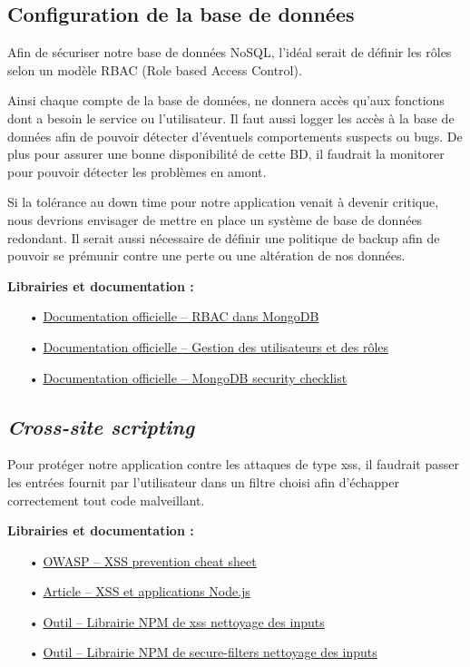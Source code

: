\documentclass[12pt]{article}
\begin{document}
\subsection{Configuration de la base de données}
\label{ssec:cm-configdb}

Afin de sécuriser notre base de données NoSQL, l'idéal serait de définir les rôles selon un modèle RBAC (Role based Access Control). 

Ainsi chaque compte de la base de données, ne donnera accès qu'aux fonctions dont a besoin le service ou l'utilisateur. Il faut aussi logger les accès à la base de données afin de pouvoir détecter d'éventuels comportements suspects ou bugs. De plus pour assurer une bonne disponibilité de cette BD, il faudrait la monitorer pour pouvoir détecter les problèmes en amont. 

Si la tolérance au down time pour notre application venait à devenir critique, nous devrions envisager de mettre en place un système de base de données redondant. Il serait aussi nécessaire de définir une politique de backup afin de pouvoir se prémunir contre une perte ou une altération de nos données.  

\medskip
\textbf{Librairies et documentation :}

\begin{itemize}
\item[•] \href{https://docs.mongodb.com/manual/core/authorization/}{Documentation officielle -- RBAC dans MongoDB}
\item[•] \href{https://docs.mongodb.com/manual/tutorial/manage-users-and-roles/}{Documentation officielle -- Gestion des utilisateurs et des rôles}
\item[•] \href{https://docs.mongodb.com/manual/administration/security-checklist/}{Documentation officielle -- MongoDB security checklist}
\end{itemize}

\subsection{\emph{Cross-site scripting}}
\label{ssec:cm-xss}

Pour protéger notre application contre les attaques de type xss, il faudrait passer les entrées fournit par l'utilisateur dans un filtre choisi afin d'échapper correctement tout code malveillant. 

\medskip
\textbf{Librairies et documentation :}

\begin{itemize}
\item[•] \href{https://www.owasp.org/index.php/XSS_(Cross_Site_Scripting)_Prevention_Cheat_Sheet}{OWASP -- XSS prevention cheat sheet}
\item[•] \href{http://scottksmith.com/blog/2015/06/22/secure-node-apps-against-owasp-top-10-cross-site-scripting/}{Article -- XSS et applications Node.js}
\item[•] \href{https://www.npmjs.com/package/xss}{Outil -- Librairie NPM de xss nettoyage des inputs}
\item[•] \href{https://www.npmjs.com/package/secure-filters}{Outil -- Librairie NPM de secure-filters nettoyage des inputs}
\end{itemize}
\end{document}
